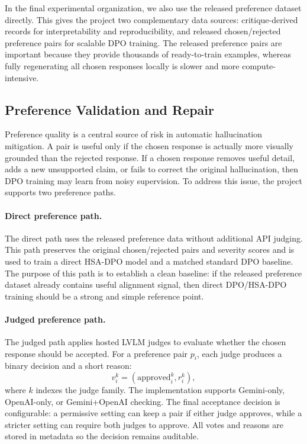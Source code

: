 \documentclass{article}
\begin{document}
In the final experimental organization, we also use the released preference dataset directly. This gives the project two complementary data sources: critique-derived records for interpretability and reproducibility, and released chosen/rejected preference pairs for scalable DPO training. The released preference pairs are important because they provide thousands of ready-to-train examples, whereas fully regenerating all chosen responses locally is slower and more compute-intensive.

\subsection{Preference Validation and Repair}

Preference quality is a central source of risk in automatic hallucination mitigation. A pair is useful only if the chosen response is actually more visually grounded than the rejected response. If a chosen response removes useful detail, adds a new unsupported claim, or fails to correct the original hallucination, then DPO training may learn from noisy supervision. To address this issue, the project supports two preference paths.

\paragraph{Direct preference path.}
The direct path uses the released preference data without additional API judging. This path preserves the original chosen/rejected pairs and severity scores and is used to train a direct HSA-DPO model and a matched standard DPO baseline. The purpose of this path is to establish a clean baseline: if the released preference dataset already contains useful alignment signal, then direct DPO/HSA-DPO training should be a strong and simple reference point.

\paragraph{Judged preference path.}
The judged path applies hosted LVLM judges to evaluate whether the chosen response should be accepted. For a preference pair $p_i$, each judge produces a binary decision and a short reason:
\begin{equation}
v_i^k = (\mathrm{approved}_i^k, r_i^k),
\end{equation}
where $k$ indexes the judge family. The implementation supports Gemini-only, OpenAI-only, or Gemini+OpenAI checking. The final acceptance decision is configurable: a permissive setting can keep a pair if either judge approves, while a stricter setting can require both judges to approve. All votes and reasons are stored in metadata so the decision remains auditable.
\end{document}
